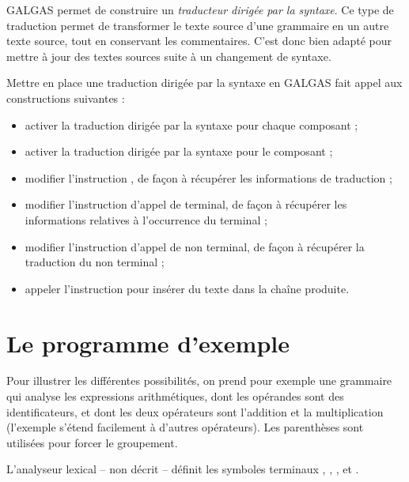 

GALGAS permet de construire un \emph{traducteur dirigée par la syntaxe}. Ce type de traduction permet de transformer le texte source d'une grammaire en un autre texte source, tout en conservant les commentaires. C'est donc bien adapté pour mettre à jour des textes sources suite à un changement de syntaxe.

Mettre en place une traduction dirigée par la syntaxe en GALGAS fait appel aux constructions suivantes :
\begin{itemize}
  \item activer la traduction dirigée par la syntaxe pour chaque composant  ;
  \item activer la traduction dirigée par la syntaxe pour le composant  ;
  \item modifier l'instruction , de façon à récupérer les informations de traduction ;
  \item modifier l'instruction d'appel de terminal, de façon à récupérer les informations relatives à l'occurrence du terminal ;
  \item modifier l'instruction d'appel de non terminal, de façon à récupérer la traduction du non terminal ;
  \item appeler l'instruction  pour insérer du texte dans la chaîne produite.
\end{itemize}








\section{Le programme d'exemple}

Pour illustrer les différentes possibilités, on prend pour exemple une grammaire qui analyse les expressions arithmétiques, dont les opérandes sont des identificateurs, et dont les deux opérateurs sont l'addition et la multiplication (l'exemple s'étend facilement à d'autres opérateurs). Les parenthèses sont utilisées pour forcer le groupement.

L'analyseur lexical -- non décrit -- définit les symboles terminaux , \galgas{$+$}, \galgas{$*$}, \galgas{$($} et \galgas{$)$}.

